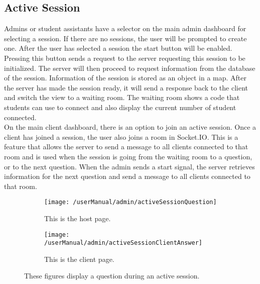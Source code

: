 \subsection{Active Session}
Admins or student assistants have a selector on the main admin dashboard for selecting a session. If there are no sessions, the user will be prompted to create one. After the user has selected a session the start button will be enabled. Pressing this button sends a request to the server requesting this session to be initialized. The server will then proceed to request information from the database of the session. Information of the session is stored as an object in a map. After the server has made the session ready, it will send a response back to the client and switch the view to a waiting room. The waiting room shows a code that students can use to connect and also display the current number of student connected. 
\\[11pt]
On the main client dashboard, there is an option to join an active session. Once a client has joined a session, the user also joins a room in Socket.IO. This is a feature that allows the server to send a message to all clients connected to that room and is used when the session is going from the waiting room to a question, or to the next question. When the admin sends a start signal, the server retrieves information for the next question and send a message to all clients connected to that room.

\begin{figure}[H]
	\centering
	\begin{subfigure}{\linewidth}
		\centering
		\texttt{[image: /userManual/admin/activeSessionQuestion]}
		\caption{This is the host page.}
		\label{fig:activeSessionAdmin}
	\end{subfigure}
	\begin{subfigure}{\linewidth}
		\centering
		\texttt{[image: /userManual/admin/activeSessionClientAnswer]}
		\caption{This is the client page.}
		\label{fig:activeSessionClient}
	\end{subfigure}
	\label{fig:activeSession}
	\caption{These figures display a question during an active session.}
\end{figure}

